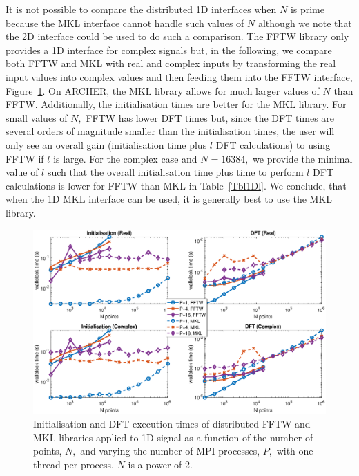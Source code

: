 \documentclass[a4paper]{article}
\begin{document}
It is not possible to compare the distributed 1D interfaces when $N$
is prime because the MKL interface cannot handle such values of $N$
although we note that the 2D interface could be used to do such a
comparison. The FFTW library only provides a 1D interface for complex
signals but, in the following, we compare both FFTW and MKL with real
and complex inputs by transforming the real input values into complex
values and then feeding them into the FFTW interface,
Figure~\ref{1DDistFFTWMKL2}. On ARCHER, the MKL library allows for
much larger values of $N$ than FFTW. Additionally, the initialisation
times are better for the MKL library. For small values of $N,$ FFTW
has lower DFT times but, since the DFT times are several orders of
magnitude smaller than the initialisation times, the user will only
see an overall gain (initialisation time plus $l$ DFT calculations) to
using FFTW if $l$ is large. For the complex case and $N=16384,$ we
provide the minimal value of $l$ such that the overall initialisation
time plus time to perform $l$ DFT calculations is lower for FFTW than
MKL in Table~\ref{Tbl1Dl}. We conclude, that when the 1D MKL
interface can be used, it is generally best to use the MKL library.

\begin{figure}[htb]
    \centering
    \includegraphics[width=0.9\linewidth]{../results/fftw_mkl_2_1d_mpi.eps}
  \caption{Initialisation and DFT execution times of distributed FFTW and MKL libraries applied to 1D signal as a function of the
    number of points, $N,$ and varying the number of MPI processes, $P,$ with one thread per process. $N$ is a power of 2.}
  \label{1DDistFFTWMKL2}
\end{figure}
\end{document}
